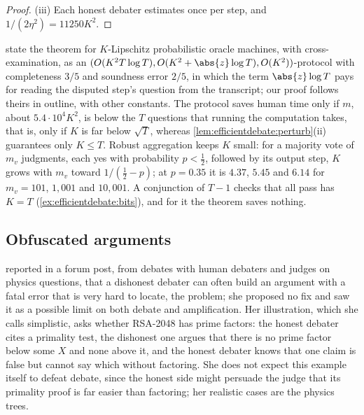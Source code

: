 \begin{refsection}
\begin{proof}
(iii) Each honest debater estimates once per step, and $1/(2\eta^2)=11250K^2$.
\end{proof}

\Textcite{BrownCohenEtAl2024} state the theorem for $K$-Lipschitz probabilistic oracle machines, with cross-examination, as an $(O(K^2T\log T),O(K^2+\abs{z}\log T),O(K^2))$-protocol with completeness $3/5$ and soundness error $2/5$, in which the term $\abs{z}\log T$ pays for reading the disputed step's question from the transcript; our proof follows theirs in outline, with other constants. The protocol saves human time only if $m$, about $5.4\cdot10^4K^2$, is below the $T$ questions that running the computation takes, that is, only if $K$ is far below $\sqrt T$, whereas \cref{lem:efficientdebate:perturb}(ii) guarantees only $K\le T$. Robust aggregation keeps $K$ small: for a majority vote of $m_v$ judgments, each yes with probability $p<\frac12$, followed by its output step, $K$ grows with $m_v$ toward $1/(\frac12-p)$; at $p=0.35$ it is $4.37$, $5.45$ and $6.14$ for $m_v=101$, $1{,}001$ and $10{,}001$. A conjunction of $T-1$ checks that all pass has $K=T$ (\cref{ex:efficientdebate:bits}), and for it the theorem saves nothing.

\subsection{Obfuscated arguments}\label{sec:efficientdebate:obfuscation}

\Textcite{Barnes2020} reported in a forum post, from debates with human debaters and judges on physics questions, that a dishonest debater can often build an argument with a fatal error that is very hard to locate, the  problem; she proposed no fix and saw it as a possible limit on both debate and amplification. Her illustration, which she calls simplistic, asks whether RSA-2048 has prime factors: the honest debater cites a primality test, the dishonest one argues that there is no prime factor below some $X$ and none above it, and the honest debater knows that one claim is false but cannot say which without factoring. She does not expect this example itself to defeat debate, since the honest side might persuade the judge that its primality proof is far easier than factoring; her realistic cases are the physics trees.


\end{refsection}
